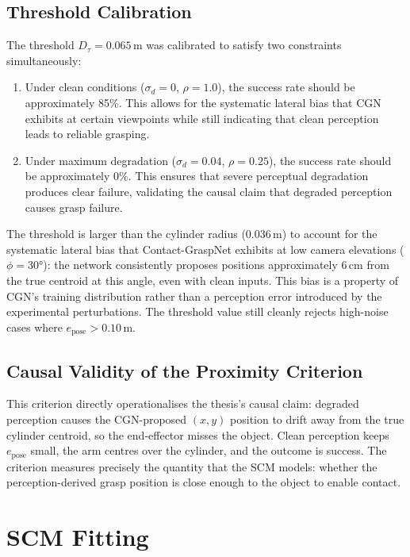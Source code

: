\documentclass[11pt,a4paper]{report}
\begin{document}
\subsection{Threshold Calibration}

The threshold $D_\tau = 0.065$\,m was calibrated to satisfy two constraints simultaneously:

\begin{enumerate}
  \item Under clean conditions ($\sigma_d = 0$, $\rho = 1.0$), the success rate should be approximately 85\%. This allows for the systematic lateral bias that CGN exhibits at certain viewpoints while still indicating that clean perception leads to reliable grasping.

  \item Under maximum degradation ($\sigma_d = 0.04$, $\rho = 0.25$), the success rate should be approximately 0\%. This ensures that severe perceptual degradation produces clear failure, validating the causal claim that degraded perception causes grasp failure.
\end{enumerate}

The threshold is larger than the cylinder radius (0.036\,m) to account for the systematic lateral bias that Contact-GraspNet exhibits at low camera elevations ($\phi = 30°$): the network consistently proposes positions approximately 6\,cm from the true centroid at this angle, even with clean inputs. This bias is a property of CGN's training distribution rather than a perception error introduced by the experimental perturbations. The threshold value still cleanly rejects high-noise cases where $e_{\text{pose}} > 0.10$\,m.

\subsection{Causal Validity of the Proximity Criterion}

This criterion directly operationalises the thesis's causal claim: degraded perception causes the CGN-proposed $(x, y)$ position to drift away from the true cylinder centroid, so the end-effector misses the object. Clean perception keeps $e_{\text{pose}}$ small, the arm centres over the cylinder, and the outcome is success. The criterion measures precisely the quantity that the SCM models: whether the perception-derived grasp position is close enough to the object to enable contact.

\section{SCM Fitting}
\label{sec:scm_fitting}
\end{document}
